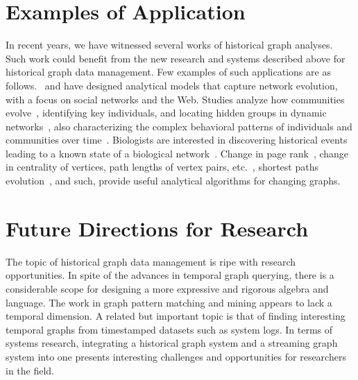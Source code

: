 \documentclass[graybox, natbib, nosecnum, twocolumn]{svmult}
\begin{document}
\section{Examples of Application}
In recent years, we have witnessed several works of historical graph analyses. Such work could benefit from the new research and systems described above for historical graph data management. Few examples of such applications are as follows.~\citet{LeskovecKF07} and \citet{Kumar:2006:SEO:1150402.1150476} have designed analytical models that capture network evolution, with a focus on
social networks and the Web. Studies analyze how communities evolve~\citep{tang2008community}, identifying key individuals,
and locating hidden groups in dynamic networks~\citep{tantipathananandh2007framework}, also characterizing the complex behavioral patterns 
of individuals and communities over time~\citep{Asur2009}.
Biologists are interested in discovering historical events leading to a 
known state of a biological network~\citep{10.1371/journal.pcbi.1001119}.
Change in page rank~\citep{bahmani2010fast}, change in centrality of vertices, path lengths of vertex pairs,
etc.~\citep{pan2011path}, shortest paths evolution~\citep{RenEvolvGraph11}, and such, provide useful analytical algorithms for changing graphs.


\section{Future Directions for Research}
The topic of historical graph data management is ripe with research opportunities. 
In spite of the advances in temporal graph querying, there is a considerable scope for designing a more expressive and rigorous algebra and language. 
The work in graph pattern matching and mining appears to lack a temporal dimension. A related but important topic is that of finding interesting temporal graphs from timestamped datasets such as system logs. 
In terms of systems research, integrating a historical graph system and a streaming graph system into one presents interesting challenges and opportunities for researchers in the field. 
\end{document}
